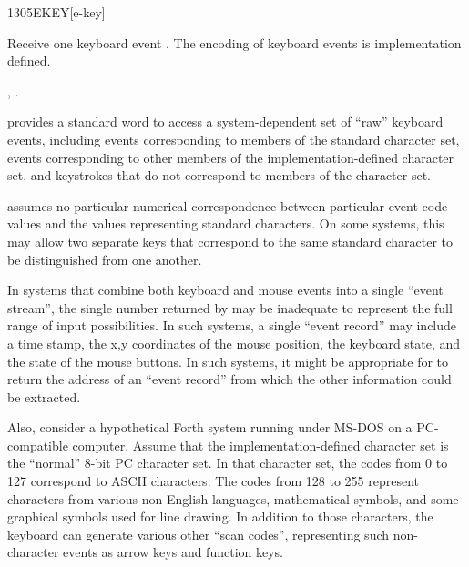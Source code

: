 \begin{worddef}{1305}{EKEY}[e-key]
\item {}

	Receive one keyboard event . The encoding of keyboard events
	is implementation defined.

\see {},
	.

	\begin{defer}
	\rationale %
		 provides a standard word to access a system-dependent
		set of ``raw'' keyboard events, including events corresponding
		to members of the standard character set, events corresponding
		to other members of the implementation-defined character set,
		and keystrokes that do not correspond to members of the
		character set.

		 assumes no particular numerical correspondence
		between particular event code values and the values representing
		standard characters. On some systems, this may allow two
		separate keys that correspond to the same standard character
		to be distinguished from one another.

		In systems that combine both keyboard and mouse events into a
		single ``event stream'', the single number returned by
		 may be inadequate to represent the full range of
		input possibilities. In such systems, a single ``event record''
		may include a time stamp, the x,y coordinates of the mouse
		position, the keyboard state, and the state of the mouse
		buttons. In such systems, it might be appropriate for 
		to return the address of an ``event record'' from which the
		other information could be extracted.


		Also, consider a hypothetical Forth system running under
		MS-DOS on a PC-compatible computer. Assume that the
		implementation-defined character set is the ``normal'' 8-bit
		PC character set. In that character set, the codes from 0 to
		127 correspond to ASCII characters. The codes from 128 to 255
		represent characters from various non-English languages,
		mathematical symbols, and some graphical symbols used for line
		drawing. In addition to those characters, the keyboard can
		generate various other ``scan codes'', representing such
		non-character events as arrow keys and function keys.


\end{defer}
\end{worddef}
